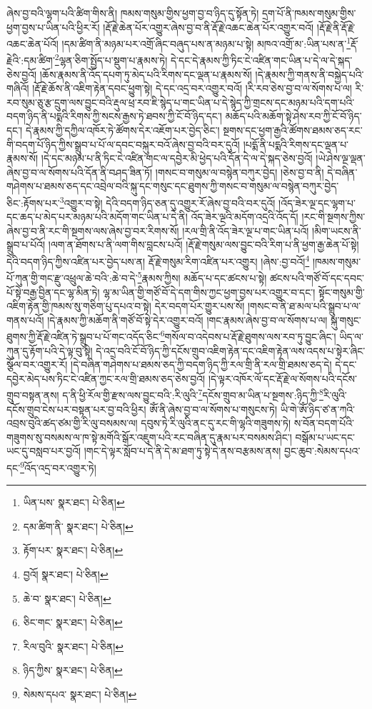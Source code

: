 ཞེས་བྱ་བའི་ལྷག་པའི་ཚིག་གིས་ནི། ཁམས་གསུམ་གྱིས་ཕྱག་བྱ་བ་ཉིད་དུ་སྟོན་ཏེ། དྲག་པོ་ནི་ཁམས་གསུམ་གྱིས་ཕྱག་བྱས་པ་ཡིན་པའི་ཕྱིར་རོ། །རྡོ་རྗེ་ཆེན་པོར་འགྱུར་ཞེས་བྱ་བ་ནི་རྡོ་རྗེ་འཆང་ཆེན་པོར་འགྱུར་བའོ། །རྡོ་རྗེ་ནི་རྡོ་རྗེ་འཆང་ཆེན་པོའོ། །དམ་ཚིག་ནི་མཉམ་པར་འགྲོ་ཞིང་བཞུད་པས་ན་མཉམ་པ་སྟེ། མཁའ་འགྲོ་མ་:ཡིན་པས་ན་\footnote{ཡིན་པས་  སྣར་ཐང་།  པེ་ཅིན། }རྡོ་རྗེའི་:དམ་ཚིག་\footnote{དམ་ཚིག་ནི་  སྣར་ཐང་།  པེ་ཅིན། }ལྷན་ཅིག་སྤྱོད་པ་སྡུག་པ་རྣམས་ཏེ། དེ་དང་དེ་རྣམས་ཀྱི་ཏིང་ངེ་འཛིན་གང་ཡིན་པ་དེ་ལ་དེ་སྐད་ཅེས་བྱའོ། །ཆོས་རྣམས་ནི་འོད་དཔག་ཏུ་མེད་པའི་རིགས་དང་ལྡན་པ་རྣམས་སོ། །དེ་རྣམས་ཀྱི་གནས་ནི་བསྐྱེད་པའི་གཞིའོ། །རྡོ་རྗེ་ཆོས་ནི་འཇིག་རྟེན་དབང་ཕྱུག་སྟེ། དེ་དང་འདྲ་བར་འགྱུར་བའོ། །རི་རབ་ཅེས་བྱ་བ་ལ་སོགས་པ་ལ། རི་རབ་སུམ་ཅུ་རྩ་དྲུག་ལས་བྱུང་བའི་རྡུལ་ཕྲ་རབ་ཇི་སྙེད་པ་གང་ཡིན་པ་དེ་སྙེད་ཀྱི་གྲངས་དང་མཉམ་པའི་དག་པའི་བདག་ཉིད་ནི་པདྨའི་རིགས་ཀྱི་སངས་རྒྱས་ཏེ་ཐབས་ཀྱི་ངོ་བོ་ཉིད་དང་། མཆོད་པའི་མཆོག་སྟེ་ཤེས་རབ་ཀྱི་ངོ་བོ་ཉིད་དང་། དེ་རྣམས་ཀྱི་དཀྱིལ་འཁོར་ཏེ་ཚོགས་དེར་འཇོག་པར་བྱེད་ཅིང་། སྔགས་དང་ཕྱག་རྒྱའི་ཚོགས་ཐམས་ཅད་རང་གི་བདག་པོ་ཉིད་ཀྱིས་སྒྲུབ་པ་པོ་ལ་དབང་བསྐུར་བའོ་ཞེས་བྱ་བའི་བར་དུའོ། །པདྨོ་ནི་པདྨའི་རིགས་དང་ལྡན་པ་རྣམས་སོ། །དེ་དང་མཉམ་པ་ནི་ཏིང་ངེ་འཛིན་གང་ལ་དབྱེར་མི་ཕྱེད་པའི་དོན་དེ་ལ་དེ་སྐད་ཅེས་བྱའོ། །ཡེ་ཤེས་ལྔ་ལྡན་ཞེས་བྱ་བ་ལ་སོགས་པའི་དོན་ནི་བཤད་ཟིན་ཏོ། །གསང་བ་གསུམ་ལ་བསྙེན་བཀུར་བྱེད། །ཅེས་བྱ་བ་ནི། དེ་བཞིན་གཤེགས་པ་ཐམས་ཅད་དང་འབྲེལ་བའི་སྐུ་དང་གསུང་དང་ཐུགས་ཀྱི་གསང་བ་གསུམ་ལ་བསྙེན་བཀུར་བྱེད་ཅིང་:རྟོགས་པར་\footnote{རྟོག་པར་  སྣར་ཐང་།  པེ་ཅིན། }འགྱུར་བ་སྟེ། དེའི་བདག་ཉིད་ཅན་དུ་འགྱུར་རོ་ཞེས་བྱ་བའི་བར་དུའོ། །འོད་ཟེར་ལྔ་དང་ལྷག་པ་དང་ཆད་པ་མེད་པར་མཉམ་པའི་མདོག་གང་ཡིན་པ་དེ་ནི། འོད་ཟེར་ལྔའི་མདོག་འདྲའི་འོད་དོ། །རང་གི་སྔགས་ཀྱིས་ཞེས་བྱ་བ་ནི་རང་གི་སྔགས་ལས་ཞེས་བྱ་བར་རིགས་སོ། །རལ་གྲི་ནི་འོད་ཟེར་ལྔ་པ་གང་ཡིན་པའོ། །མིག་ཡངས་ནི་སྒྲུབ་པ་པོའོ། །ལག་ན་ཐོགས་པ་ནི་ལག་གིས་བླངས་པའོ། །རྡོ་རྗེ་གསུམ་ལས་བྱུང་བའི་རིག་པ་ནི་ཕྱག་རྒྱ་ཆེན་པོ་སྟེ། དེའི་བདག་ཉིད་ཀྱིས་འཛིན་པར་བྱེད་པས་ན། རྡོ་རྗེ་གསུམ་རིག་འཛིན་པར་འགྱུར། །ཞེས་:བྱ་བའོ།\footnote{བྱའོ།  སྣར་ཐང་།  པེ་ཅིན། } །ཁམས་གསུམ་པོ་ཀུན་གྱི་གང་རྫུ་འཕྲུལ་ཆེ་བའི་:ཆེ་བ་དེ་\footnote{ཆེ་བ་  སྣར་ཐང་།  པེ་ཅིན། }རྣམས་ཀྱིས། མཆོད་པ་དང་ཚངས་པ་སྟེ། ཚངས་པའི་གཙོ་བོ་དང་དབང་པོ་སྟེ་བརྒྱ་བྱིན་དང་ལྷ་མིན་ཏེ། ལྷ་མ་ཡིན་གྱི་གཙོ་བོ་དེ་དག་གིས་ཀྱང་ཕྱག་བྱས་པར་འགྱུར་བ་དང་། སྟོང་གསུམ་གྱི་འཇིག་རྟེན་གྱི་ཁམས་སུ་གཅིག་པུ་དཔའ་བ་སྟེ། དེར་བདག་པོར་གྱུར་པས་སོ། །གསང་བ་ནི་ཐ་མལ་པའི་སྒྲུབ་པ་ལ་གནས་པའོ། །དེ་རྣམས་ཀྱི་མཆོག་ནི་གཙོ་བོ་སྟེ་དེར་འགྱུར་བའོ། །གང་རྣམས་ཞེས་བྱ་བ་ལ་སོགས་པ་ལ། སྐུ་གསུང་ཐུགས་ཀྱི་རྡོ་རྗེ་འཛིན་ཏེ་སྒྲུབ་པ་པོ་གང་འདོད་ཅིང་\footnote{ཅིང་གང་  སྣར་ཐང་།  པེ་ཅིན། }གསོལ་བ་འདེབས་པ་རྡོ་རྗེ་ཐུགས་ལས་རབ་ཏུ་བྱུང་ཞིང་། ཡིད་ལ་ཀུན་དུ་རྟོག་པའི་དེ་ལྟ་བུ་སྟེ། དེ་འདྲ་བའི་ངོ་བོ་ཉིད་ཀྱི་དངོས་གྲུབ་འཇིག་རྟེན་དང་འཇིག་རྟེན་ལས་འདས་པ་སྟེར་ཞིང་སྩོལ་བར་འགྱུར་རོ། །དེ་བཞིན་གཤེགས་པ་ཐམས་ཅད་ཀྱི་བདག་ཉིད་ཀྱི་རལ་གྲི་ནི་རལ་གྲི་ཐམས་ཅད་དེ། དེ་དང་དབྱེར་མེད་པས་ཏིང་ངེ་འཛིན་ཀྱང་རལ་གྲི་ཐམས་ཅད་ཅེས་བྱའོ། །དེ་ལྟར་འཁོར་ལོ་དང་རྡོ་རྗེ་ལ་སོགས་པའི་དངོས་གྲུབ་བསྟན་ནས། ད་ནི་ཕྱི་རོལ་གྱི་རྫས་ལས་བྱུང་བའི་:རི་ལུའི་\footnote{རིལ་བུའི་  སྣར་ཐང་།  པེ་ཅིན། }དངོས་གྲུབ་མ་ཡིན་པ་སྔགས་:ཉིད་ཀྱི་\footnote{ཉིད་ཀྱིས་  སྣར་ཐང་།  པེ་ཅིན། }རི་ལུའི་དངོས་གྲུབ་ངེས་པར་བསྟན་པར་བྱ་བའི་ཕྱིར། ཨོཾ་ནི་ཞེས་བྱ་བ་ལ་སོགས་པ་གསུངས་ཏེ། ཡི་གེ་ཨོཾ་ཉིད་ཙ་ན་ཀའི་འབྲས་བུའི་ཚད་ཙམ་གྱི་རི་ལུ་བསམས་ལ། དབུས་ཏེ་རི་ལུའི་ནང་དུ་རང་གི་ལྷའི་གཟུགས་ཏེ། ས་བོན་བདག་པོའི་གཟུགས་སུ་བསམས་ལ་ཁ་སྟེ་མགོའི་སྒོར་འཇུག་པའི་རང་བཞིན་དུ་རྣམ་པར་བསམས་ཤིང་། བསྒོམ་པ་ཡང་དང་ཡང་དུ་བསླབ་པར་བྱའོ། །གང་དེ་ལྟར་སློབ་པ་དེ་ནི་དེ་མ་ཐག་ཏུ་སྟེ་དེ་ནས་བརྩམས་ནས། བྱང་ཆུབ་:སེམས་དཔའ་དང་\footnote{སེམས་དཔའ་  སྣར་ཐང་།  པེ་ཅིན། }འོད་འདྲ་བར་འགྱུར་ཏེ། 